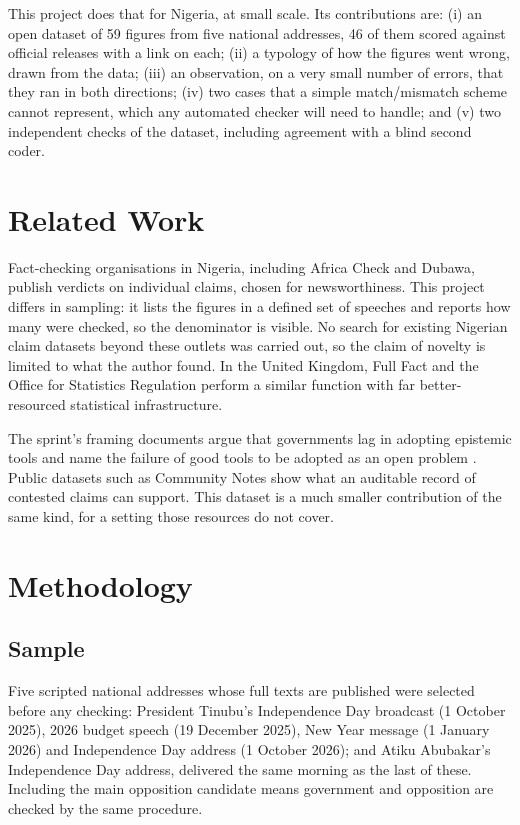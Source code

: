 \documentclass[11pt]{article}
\begin{document}
This project does that for Nigeria, at small scale. Its contributions are: (i) an open dataset of 59 figures from five national addresses, 46 of them scored against official releases with a link on each; (ii) a typology of how the figures went wrong, drawn from the data; (iii) an observation, on a very small number of errors, that they ran in both directions; (iv) two cases that a simple match/mismatch scheme cannot represent, which any automated checker will need to handle; and (v) two independent checks of the dataset, including agreement with a blind second coder.

\section{Related Work}

Fact-checking organisations in Nigeria, including Africa Check and Dubawa, publish verdicts on individual claims, chosen for newsworthiness. This project differs in sampling: it lists the figures in a defined set of speeches and reports how many were checked, so the denominator is visible. No search for existing Nigerian claim datasets beyond these outlets was carried out, so the claim of novelty is limited to what the author found. In the United Kingdom, Full Fact and the Office for Statistics Regulation perform a similar function with far better-resourced statistical infrastructure.

The sprint's framing documents argue that governments lag in adopting epistemic tools \cite{vaintrob_gap} and name the failure of good tools to be adopted as an open problem \cite{vaintrob_tools}. Public datasets such as Community Notes \cite{chuai} show what an auditable record of contested claims can support. This dataset is a much smaller contribution of the same kind, for a setting those resources do not cover.

\section{Methodology}

\subsection{Sample}

Five scripted national addresses whose full texts are published were selected before any checking: President Tinubu's Independence Day broadcast (1 October 2025), 2026 budget speech (19 December 2025), New Year message (1 January 2026) and Independence Day address (1 October 2026); and Atiku Abubakar's Independence Day address, delivered the same morning as the last of these. Including the main opposition candidate means government and opposition are checked by the same procedure.
\end{document}

